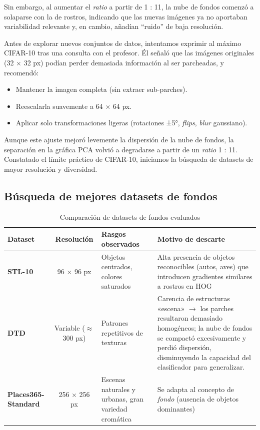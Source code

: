 \documentclass{article}
\begin{document}
Sin embargo, al aumentar el \textit{ratio} a partir de 1 : 11, la nube de fondos comenzó a solaparse con la de rostros, indicando que las nuevas imágenes ya no aportaban variabilidad relevante y, en cambio, añadían “ruido” de baja resolución.

Antes de explorar nuevos conjuntos de datos, intentamos exprimir al máximo CIFAR-10 tras una consulta con el profesor. Él señaló que las imágenes originales (32 × 32 px) podían perder demasiada información al ser parcheadas, y recomendó:
\begin{itemize}
    \item Mantener la imagen completa (sin extraer sub-parches).
    \item Reescalarla suavemente a 64 × 64 px.
    \item Aplicar solo transformaciones ligeras (rotaciones ±5°, \textit{flips}, \textit{blur} gaussiano).
\end{itemize}

Aunque este ajuste mejoró levemente la dispersión de la nube de fondos, la separación en la gráfica PCA volvió a degradarse a partir de un \textit{ratio} 1 : 11. Constatado el límite práctico de CIFAR-10, iniciamos la búsqueda de datasets de mayor resolución y diversidad.

\subsection*{Búsqueda de mejores datasets de fondos}

\begin{table}[ht]
\centering
\begin{tabular}{|p{2cm}|c|p{5cm}|p{5cm}|}
\hline
\textbf{Dataset} & \textbf{Resolución} & \textbf{Rasgos observados} & \textbf{Motivo de descarte} \\ \hline
\textbf{STL-10} & 96 × 96 px & Objetos centrados, colores saturados & Alta presencia de objetos reconocibles (autos, aves) que introducen gradientes similares a rostros en HOG \\ \hline
\textbf{DTD} & Variable ($\approx$ 300 px) & Patrones repetitivos de texturas & Carencia de estructuras «escena» $\rightarrow$ los parches resultaron demasiado homogéneos; la nube de fondos se compactó excesivamente y perdió dispersión, disminuyendo la capacidad del clasificador para generalizar. \\ \hline
\textbf{Places365-Standard} & 256 × 256 px & Escenas naturales y urbanas, gran variedad cromática & Se adapta al concepto de \textit{fondo} (ausencia de objetos dominantes) \\ \hline
\end{tabular}
\caption{Comparación de datasets de fondos evaluados}
\label{tab:datasets}
\end{table}
\end{document}
